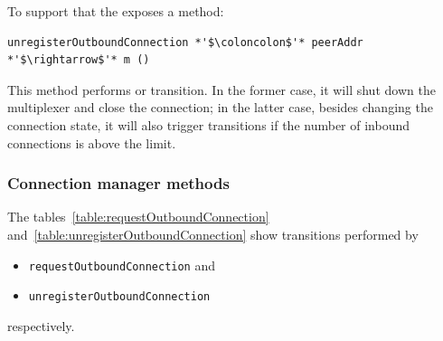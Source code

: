 To support that the \connmngr{} exposes a method:

\begin{lstlisting}
unregisterOutboundConnection *'$\coloncolon$'* peerAddr *'$\rightarrow$'* m ()
\end{lstlisting}
This method performs \DemotedToColdUniLoc{} or
\DemotedToColdDupLoc{} transition. In the former case, it will shut down the
multiplexer and close the \TCP{} connection; in the latter case, besides
changing the connection state, it will also trigger \Prune{} transitions if
the number of inbound connections is above the limit.

\subsubsection{Connection manager methods}

The tables~\ref{table:requestOutboundConnection}
and~\ref{table:unregisterOutboundConnection} show transitions performed by
\begin{itemize}
  \item \texttt{requestOutboundConnection} and
  \item \texttt{unregisterOutboundConnection}
\end{itemize}
respectively.


